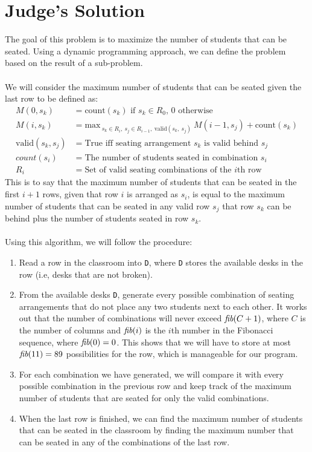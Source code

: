 \documentclass[11pt]{article}
\begin{document}
\section{Judge's Solution}
The goal of this problem is to maximize the number of students that
can be seated. Using a dynamic programming approach, we can define
the problem based on the result of a sub-problem.
\\\\
We will consider the maximum number of students that can be seated
given the last row to be defined as:
\begin{align*}
M(0, s_k) &= \text{count}(s_k) \text{ if } s_k \in R_0\text{, } 0 \text{ otherwise}\\
M(i, s_k) &= \text{max}_{\ s_k \in R_i,\ s_j \in R_{i-1},\ \text{valid}(s_k,\ s_j)}\ M(i-1, s_j) + \text{count}(s_k) \\
\text{valid}(s_k, s_j) &= \text{True iff seating arrangement }s_k\text{ is valid behind }s_j\\
count(s_i) &= \text{The number of students seated in combination }s_i \\
R_i &= \text{Set of valid seating combinations of the }i\text{th row}
\end{align*}
This is to say that the maximum number of students that can be seated in
the first $i+1$ rows, given that row $i$ is arranged as $s_i$, is equal to
the maximum number of students that can be seated in any valid row $s_j$ that
row $s_k$ can be behind plus the number of students seated in row $s_k$.
\\\\
Using this algorithm, we will follow the procedure:
\begin{enumerate}
\item Read a row in the classroom into \texttt{D}, where \texttt{D} stores the
available desks in the row (i.e, desks that are not broken).
\item From the available desks \texttt{D}, generate every possible combination of seating
arrangements that do not place any two students next to each other. It works
out that the number of combinations will never exceed $\emph{fib}(C+1)$, where
$C$ is the number of columns and $\emph{fib}(i)$ is the $i$th number in the
Fibonacci sequence, where $\emph{fib}(0) = 0$. This shows that we will have to store at most
$\emph{fib}(11) = 89$ possibilities for the row, which is manageable for our program.
\item For each combination we have generated, we will compare it with every
possible combination in the previous row and keep track of the maximum number
of students that are seated for only the valid combinations.
\item When the last row is finished, we can find the maximum number of students that
can be seated in the classroom by finding the maximum number that can be seated
in any of the combinations of the last row.
\end{enumerate}
\end{document}
